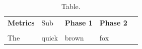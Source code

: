 \documentclass{article}
\begin{document}
\begin{table}[!ht]
\caption{Table.}
\label{tab:task}
\begin{tabular}{|l|l|l|l|l|}
\hline
 \textbf{Metrics} & Sub & \textbf{Phase 1} & \textbf{Phase 2} \\
\hhline{|====|}
\multicolumn{4}{|c|}{1}\\
 \hhline{|====|}
The & quick & brown  & fox \\
\hline
\end{tabular}
\normalsize
\end{table}
\end{document}
